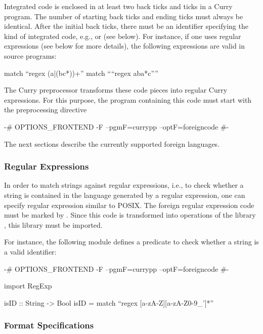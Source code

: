 Integrated code is enclosed in at least two back ticks and ticks
in a Curry program. The number of starting back ticks and ending ticks
must always be identical.
After the initial back ticks, there must be an identifier
specifying the kind of integrated code,
e.g.,  or  (see below).
For instance, if one uses regular expressions (see below for more details),
the following expressions are valid in source programs:
\begin{curry}
  match ``regex (a|(bc*))+''
  match ````regex aba*c''''
\end{curry}
The Curry preprocessor transforms these code pieces into regular
Curry expressions.
For this purpose, the program containing this code must start with
the preprocessing directive
\begin{curry}
{-# OPTIONS_FRONTEND -F --pgmF=currypp --optF=foreigncode #-}
\end{curry}
%
The next sections describe the currently supported foreign languages.


\subsubsection{Regular Expressions}

In order to match strings against regular expressions, i.e.,
to check whether a string is contained in the language
generated by a regular expression, one can specify
regular expression similar to POSIX. The foreign regular
expression code must be marked by .
Since this code is transformed into operations of the \CYS library
, this library must be imported.

For instance, the following module defines a predicate
to check whether a string is a valid identifier:

\begin{curry}
{-# OPTIONS_FRONTEND -F --pgmF=currypp --optF=foreigncode #-}

import RegExp

isID :: String -> Bool
isID = match ``regex [a-zA-Z][a-zA-Z0-9_']*''
\end{curry}


\subsubsection{Format Specifications}

